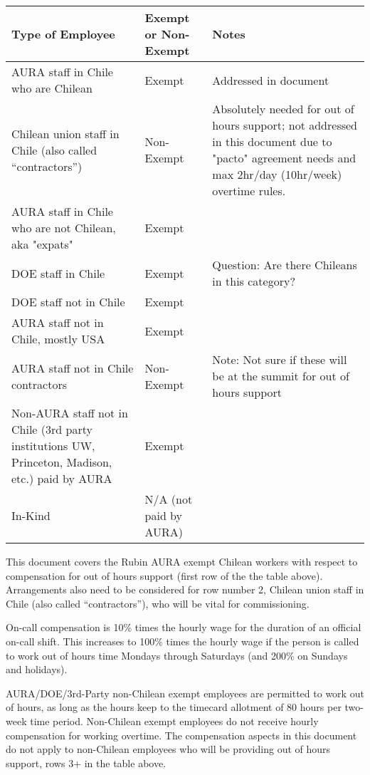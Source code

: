 \begin{longtable} {p{} p{} p{}} \hline

\textbf{Type of Employee} & \textbf{Exempt or \newline Non-Exempt} & \textbf{Notes}  \\\hline

AURA staff in Chile who are Chilean & Exempt &  Addressed in document   \\\hline
Chilean union staff in Chile (also called ``contractors'') & Non-Exempt & Absolutely needed for out of hours support;  not addressed in this document due to "pacto" agreement needs and max 2hr/day (10hr/week) overtime rules.  \\\hline
AURA staff in Chile who are not Chilean, aka "expats" & Exempt &  \\\hline
DOE staff in Chile & Exempt & Question: Are there Chileans in this category?  \\\hline
DOE staff not in Chile & Exempt &  \\\hline
AURA staff not in Chile, mostly USA & Exempt & \\\hline
AURA staff not in Chile contractors & Non-Exempt & Note: Not sure if these will be at the summit for out of hours support \\\hline
Non-AURA staff not in Chile (3rd party institutions UW, Princeton, Madison, etc.) paid by AURA & Exempt &  \\\hline
In-Kind & N/A \newline(not paid by AURA) \\\hline


\end{longtable}

This document covers the Rubin AURA exempt Chilean workers with respect to compensation for out of hours support (first row of the the table above).
Arrangements also need to be considered for row number 2, Chilean union staff in Chile (also called ``contractors''), who will be vital for commissioning.

On-call compensation is 10\% times the hourly wage for the duration of an official on-call shift.  
This increases to 100\% times the hourly wage if the person is called to work out of hours time Mondays through Saturdays (and 200\% on Sundays and holidays).

AURA/DOE/3rd-Party non-Chilean exempt employees are permitted to work out of hours, as long as the hours keep to the timecard allotment of 80 hours per two-week time period.  
Non-Chilean exempt employees do not receive hourly compensation for working overtime.
The compensation aspects in this document do not apply to non-Chilean employees who will be providing out of hours support, rows 3+ in the table above.